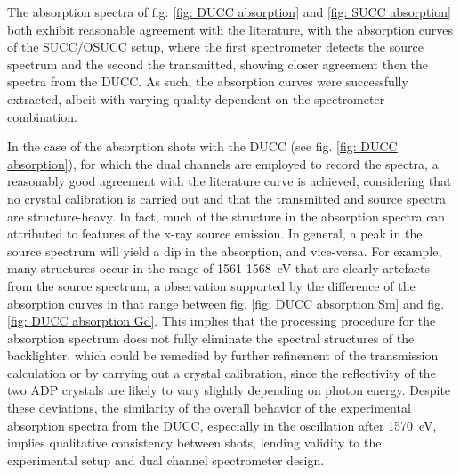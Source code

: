 The absorption spectra of fig. \ref{fig: DUCC absorption} and \ref{fig: SUCC absorption} both exhibit reasonable agreement with the literature, with the absorption curves of the SUCC/OSUCC setup, where the first spectrometer detects the source spectrum and the second the transmitted, showing closer agreement then the spectra from the DUCC. As such, the absorption curves were successfully extracted, albeit with varying quality dependent on the spectrometer combination.

In the case of the absorption shots with the DUCC (see fig. \ref{fig: DUCC absorption}), for which the dual channels are employed to record the spectra, a reasonably good agreement with the literature curve is achieved, considering that no crystal calibration is carried out and that the transmitted and source spectra are structure-heavy. In fact, much of the structure in the absorption spectra can attributed to features of the x-ray source emission. In general, a peak in the source spectrum will yield a dip in the absorption, and vice-versa. For example, many structures occur in the range of 1561-\SI{1568}{\electronvolt} that are clearly artefacts from the source spectrum, a observation supported by the difference of the absorption curves in that range between fig. \ref{fig: DUCC absorption Sm} and fig. \ref{fig: DUCC absorption Gd}. This implies that the processing procedure for the absorption spectrum does not fully eliminate the spectral structures of the backlighter, which could be remedied by further refinement of the transmission calculation or by carrying out a crystal calibration, since the reflectivity of the two ADP crystals are likely to vary slightly depending on photon energy. Despite these deviations, the similarity of the overall behavior of the experimental absorption spectra from the DUCC, especially in the oscillation after \SI{1570}{\electronvolt}, implies qualitative consistency between shots, lending validity to the experimental setup and dual channel spectrometer design.


